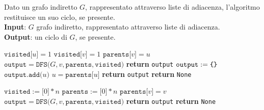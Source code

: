 \documentclass[a4paper, 12pt]{report}
\begin{document}
    \begin{algorithm}[H]
        \caption{
            Dato un grafo indiretto $G$, rappresentato attraverso liste di adiacenza, l'algoritmo restituisce un suo ciclo, se presente.\\
            \textbf{Input}: $G$ grafo indiretto, rappresentato attraverso liste di adiacenza.\\
            \textbf{Output}: un ciclo di $G$, se presente.
        }

        \begin{algorithmic}[1]
            \label{findCycleNonDir}
                \State $\texttt{visited[}u\texttt{]} = 1$
                        \State $\texttt{visited[}v\texttt{]} = 1$
                        \State $\texttt{parents[}v\texttt{]} = u$
                        \State $\texttt{output} = \texttt{DFS(}G, v, \texttt{parents}, \texttt{visited)}$
                            \State \textbf{return} \texttt{output}
                        \EndIf
                     
                        \State $\texttt{output} := \verb|{| \verb|}|$
                            \State $\texttt{output.add(}u\texttt{)}$
                            \State $u = \texttt{parents[}u\texttt{]}$
                        \EndWhile
                        \State \textbf{return} \texttt{output}
                    \EndIf
                \EndFor
                \State \textbf{return} \texttt{None}
            \EndFunction
        \end{algorithmic}
    \end{algorithm}

    \begin{nocaptionalg}
        \begin{algorithmic}[1]
                \State $\texttt{visited} := \texttt{[}0\texttt{]} * n$
                \State $\texttt{parents} := \texttt{[}0\texttt{]} * n$
                        \State $\texttt{parents[}v\texttt{]} = v$ 
                        \State $\texttt{output} = \texttt{DFS(}G, v, \texttt{parents}, \texttt{visited)}$
                            \State \textbf{return} \texttt{output}
                        \EndIf
                    \EndIf
                \EndFor
                \State \textbf{return} \texttt{None}
            \EndFunction
        \end{algorithmic}
    \end{nocaptionalg}
\end{document}
